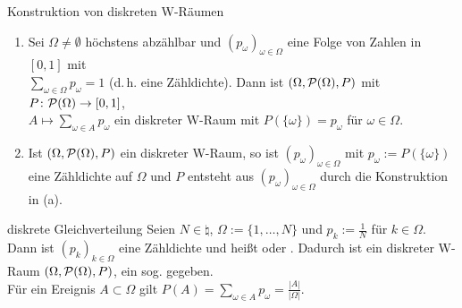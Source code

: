 \begin{Satz}{Konstruktion von diskreten W-Räumen}
    \begin{enumerate}
        \item
        Sei $\Omega \not= \emptyset$ höchstens abzählbar und $(p_\omega)_{\omega \in \Omega}$
        eine Folge von Zahlen in $[0, 1]$ mit\\
        $\sum_{\omega \in \Omega} p_\omega = 1$ (d.\,h. eine Zähldichte).
        Dann ist $(\Omega, \P(\Omega), P)$ mit $P\colon \P(\Omega) \rightarrow [0, 1]$,\\
        $A \mapsto \sum_{\omega \in A} p_\omega$ ein diskreter W-Raum mit
        $P(\{\omega\}) = p_\omega$ für $\omega \in \Omega$.

        \item
        Ist $(\Omega, \P(\Omega), P)$ ein diskreter W-Raum, so ist $(p_\omega)_{\omega \in \Omega}$
        mit $p_\omega := P(\{\omega\})$ eine Zähldichte
        auf $\Omega$ und $P$ entsteht aus $(p_\omega)_{\omega \in \Omega}$ durch die Konstruktion
        in (a).
    \end{enumerate}
\end{Satz}

\linie
\pagebreak

\begin{Def}{diskrete Gleichverteilung}
    Seien $N \in \natural$, $\Omega := \{1, \dotsc, N\}$ und $p_k := \frac{1}{N}$
    für $k \in \Omega$.
    Dann ist $(p_k)_{k \in \Omega}$ eine Zähldichte und heißt  oder
    .
    Dadurch ist ein diskreter W-Raum $(\Omega, \P(\Omega), P)$, ein sog.
     gegeben.\\
    Für ein Ereignis $A \subset \Omega$ gilt
    $P(A) = \sum_{\omega \in A} p_\omega = \frac{|A|}{|\Omega|}$.
\end{Def}

